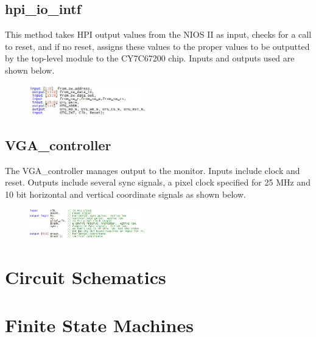 \documentclass[journal, twocolumn, final,11pt,letterpaper]{IEEEtran}
\begin{document}
	\subsection{hpi\_io\_intf}
	This method takes HPI output values from the NIOS II as input, checks for a call to reset, and if no reset, assigns these values to the proper values to be outputted by the top-level module to the CY7C67200 chip.  Inputs and outputs used are shown below. 
	
	\begin{figure}[h]
		\centering
		\includegraphics[width=0.45\textwidth]{hpiio.jpg}
		\label{fig:hpiio}
	\end{figure}
	
	\subsection{VGA\_controller}
	The VGA\_controller manages output to the monitor.  Inputs include clock and reset. Outputs include several sync signals, a pixel clock specified for 25 MHz and 10 bit horizontal and vertical coordinate signals as shown below.
	
	\begin{figure}[h]
		\centering
		\includegraphics[width=0.45\textwidth]{VGAio.jpg}
		\label{fig:VGAio}
	\end{figure}
	

	
	
	
\section{Circuit Schematics}



\section{Finite State Machines}



\end{document}
